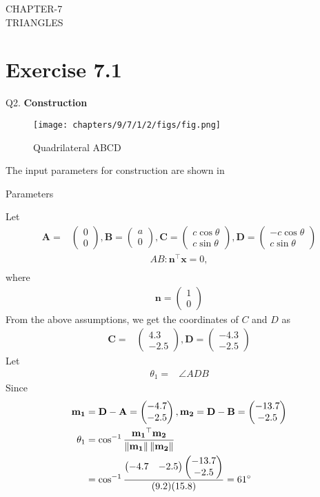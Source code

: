 \documentclass{article}
\providecommand{\norm}[1]{\left\lVert#1\right\rVert}
\newcommand{\myvec}[1]{\ensuremath{\begin{pmatrix}#1\end{pmatrix}}}
\let\vec\mathbf
\begin{document}
\begin{center}
        \textbf\large{CHAPTER-7 \\ TRIANGLES}
\end{center}
\section{Exercise 7.1}
Q2. \textbf{Construction}\\
\fi
\begin{figure}[H]
	\begin{center}
		\texttt{[image: chapters/9/7/1/2/figs/fig.png]}
	\end{center}
	\caption{Quadrilateral ABCD}
	\label{fig:chapters/9/7/1/2/Fig}
\end{figure}
The input parameters for construction are shown in 
\begin{table}[H]
    \centering
    
    \caption{Parameters}
    \label{tab:chapters/9/7/1/2/Table1}
\end{table}
Let
\begin{align}
\vec{A} =& \myvec{0\\0},\vec{B} = \myvec{a\\0},\vec{C} = \myvec{c\cos\theta\\c\sin\theta},\vec{D} = \myvec{-c\cos\theta\\c\sin\theta}
\end{align}
\begin{align}
	AB: 	\vec{n}^{\top}\vec{x} = 0,\\
\end{align}
where
\begin{align}
\vec{n} = \myvec{1\\0}
\end{align}
  From the above assumptions, we get the coordinates of $C$ and $D$ as
  \begin{align}
\vec{C} =& \myvec{4.3\\-2.5},\vec{D} = \myvec{-4.3\\-2.5}
  \end{align}
Let 
    \begin{align}
\theta_1=&\angle ADB
    \end{align}
    Since
    \begin{align}
\vec{m_1}&=\vec{D}-\vec{A}=\myvec{-4.7\\-2.5}, \vec{m_2}=\vec{D}-\vec{B}=\myvec{-13.7\\-2.5}\\
\theta_1&=\cos^{-1}\frac{\vec{m_1}^\top\vec{m_2}}{\norm{\vec{m_1}}\norm{\vec{m_2}}}\\
&=\cos^{-1}\frac{\myvec{-4.7&-2.5}\myvec{-13.7\\-2.5}}{(9.2)(15.8)}=61\degree 
\label{eq:chapters/9/7/1/2/1}
    \end{align}
\end{document}
